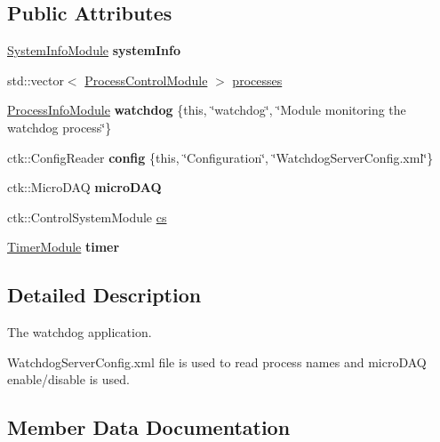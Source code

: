 \subsection*{Public Attributes}
\begin{DoxyCompactItemize}
\item 
\hyperlink{classSystemInfoModule}{System\+Info\+Module} {\bfseries system\+Info}
\item 
std\+::vector$<$ \hyperlink{structProcessControlModule}{Process\+Control\+Module} $>$ \hyperlink{structWatchdogServer_af21c89fb581f3f8ff9d3cf02509634c1}{processes}
\item 
\hyperlink{structProcessInfoModule}{Process\+Info\+Module} {\bfseries watchdog} \{this, \char`\"{}watchdog\char`\"{}, \char`\"{}Module monitoring the watchdog process\char`\"{}\}\hypertarget{structWatchdogServer_a5284e735372ca5947a8105ad3167c54a}{}\label{structWatchdogServer_a5284e735372ca5947a8105ad3167c54a}

\item 
ctk\+::\+Config\+Reader {\bfseries config} \{this, \char`\"{}Configuration\char`\"{}, \char`\"{}Watchdog\+Server\+Config.\+xml\char`\"{}\}\hypertarget{structWatchdogServer_aff0de39ddfc412f63c5ea21dafc89ddd}{}\label{structWatchdogServer_aff0de39ddfc412f63c5ea21dafc89ddd}

\item 
ctk\+::\+Micro\+D\+AQ {\bfseries micro\+D\+AQ}\hypertarget{structWatchdogServer_a886ae70481b26aa4a59915f3c0e28a56}{}\label{structWatchdogServer_a886ae70481b26aa4a59915f3c0e28a56}

\item 
ctk\+::\+Control\+System\+Module \hyperlink{structWatchdogServer_ac2a80d4a412c142f8d4753b51e12bfa3}{cs}
\item 
\hyperlink{structTimerModule}{Timer\+Module} {\bfseries timer}
\end{DoxyCompactItemize}


\subsection{Detailed Description}
The watchdog application. 

Watchdog\+Server\+Config.\+xml file is used to read process names and micro\+D\+AQ enable/disable is used. 

\subsection{Member Data Documentation}
